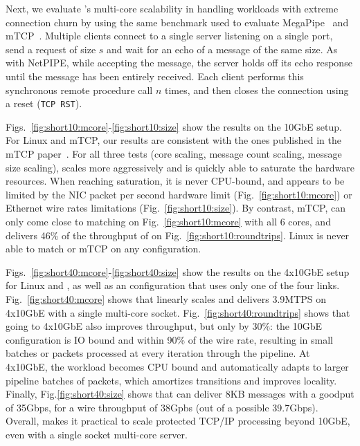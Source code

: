 Next, we evaluate \ix's multi-core scalability in handling workloads
with extreme connection churn by using the same benchmark used to
evaluate MegaPipe~\cite{DBLP:conf/osdi/HanMCR12} and
mTCP~\cite{jeong2014mtcp}. Multiple clients connect to a single server
listening on a single port, send a request of size $s$ and wait for an
echo of a message of the same size.  As with NetPIPE, while accepting
the message, the server holds off its echo response until the message
has been entirely received.  Each client performs this synchronous
remote procedure call $n$ times, and then closes the connection using a
reset (\texttt{TCP RST}).  



Figs.~\ref{fig:short10:mcore}-\ref{fig:short10:size} show the results
on the 10GbE setup.  For Linux and mTCP, our results are consistent
with the ones published in the mTCP paper~\cite{jeong2014mtcp}.  For
all three tests (core scaling, message count scaling, message size
scaling), \ix scales more aggressively and is quickly able to saturate
the hardware resources.  When reaching saturation, it is never
CPU-bound, and appears to be limited by the NIC packet per second
hardware limit (Fig.~\ref{fig:short10:mcore}) or Ethernet wire rates
limitations (Fig.~\ref{fig:short10:size}).  By contrast, mTCP, can
only come close to matching \ix on Fig.~\ref{fig:short10:mcore} with
all 6 cores, and delivers 46\% of the throughput of \ix on
Fig.~\ref{fig:short10:roundtrips}.  Linux is never able to match \ix
or mTCP on any configuration.


Figs.~\ref{fig:short40:mcore}-\ref{fig:short40:size} show the results
on the 4x10GbE setup for Linux and \ix, as well as an \ix
configuration that uses only one of the four
links. Fig.~\ref{fig:short40:mcore} shows that \ix linearly scales and
delivers 3.9MTPS on 4x10GbE with a single multi-core socket.
Fig.~\ref{fig:short40:roundtrips} shows that going to 4x10GbE also
improves throughput, but only by 30\%: the 10GbE configuration is IO
bound and within 90\% of the wire rate, resulting in small batches or
 packets processed at every iteration through the \ix
pipeline.  At 4x10GbE, the workload becomes CPU bound and \ix
automatically adapts to larger pipeline batches of 
packets, which amortizes transitions and improves locality.  Finally,
Fig.\ref{fig:short40:size} shows that \ix can deliver 8KB messages
with a goodput of 35Gbps, for a wire throughput of 38Gpbs (out of a
possible 39.7Gbps).  Overall, \ix makes it practical to scale
protected TCP/IP processing beyond 10GbE, even with a single socket
multi-core server.


